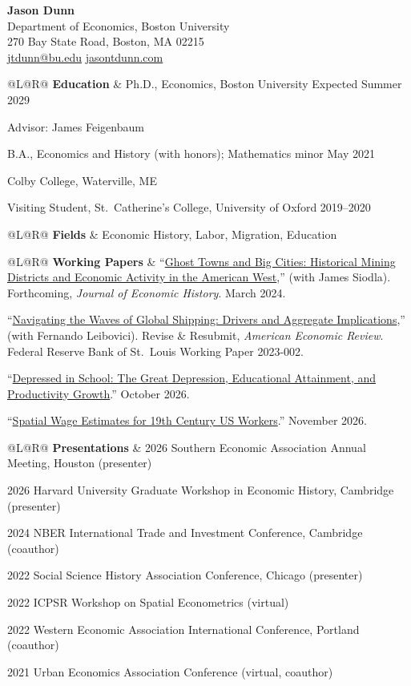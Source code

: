 \documentclass[11pt]{article}
\makeatletter
\newcommand{\cvrow}[2]{%
  \vspace{8pt}%
  \noindent
  \begin{tabular}{@{}L@{\hspace{10pt}}R@{}}
    {\bfseries #1} & #2
  \end{tabular}\par
}
\newcommand{\gap}{\par\vspace{4pt}}
\newcommand{\entry}[1]{\par\vspace{5pt}#1}
\makeatother
\begin{document}
\begin{center}
{\LARGE\bfseries Jason Dunn}\\[4pt]
Department of Economics, Boston University\\
270 Bay State Road, Boston, MA 02215\\[2pt]
\href{mailto:jtdunn@bu.edu}{jtdunn@bu.edu} \quad \href{https://jasontdunn.com}{jasontdunn.com}
\end{center}

\cvrow{Education}{%
Ph.D., Economics, Boston University \hfill Expected Summer 2029\par
Advisor: James Feigenbaum
\gap
B.A., Economics and History (with honors); Mathematics minor \hfill May 2021\par
Colby College, Waterville, ME
\gap
Visiting Student, St.\ Catherine's College, University of Oxford \hfill 2019--2020
}

\cvrow{Fields}{%
Economic History, Labor, Migration, Education
}

\cvrow{Working Papers}{%
``\href{https://jasontdunn.com/assets/mining.pdf}{Ghost Towns and Big Cities: Historical Mining Districts and Economic Activity in the American West},'' (with James Siodla). Forthcoming, \textit{Journal of Economic History}. March 2024.
\entry{``\href{https://jasontdunn.com/assets/shipping.pdf}{Navigating the Waves of Global Shipping: Drivers and Aggregate Implications},'' (with Fernando Leibovici). Revise \& Resubmit, \textit{American Economic Review}. Federal Reserve Bank of St.\ Louis Working Paper 2023-002.}
\entry{``\href{https://jasontdunn.com/assets/depressed.pdf}{Depressed in School: The Great Depression, Educational Attainment, and Productivity Growth}.'' October 2026.}
\entry{``\href{https://jasontdunn.com/assets/spatialwages.pdf}{Spatial Wage Estimates for 19th Century US Workers}.'' November 2026.}
}

\cvrow{Presentations}{%
2026 Southern Economic Association Annual Meeting, Houston (presenter)\par
2026 Harvard University Graduate Workshop in Economic History, Cambridge (presenter)\par
2024 NBER International Trade and Investment Conference, Cambridge (coauthor)\par
2022 Social Science History Association Conference, Chicago (presenter)\par
2022 ICPSR Workshop on Spatial Econometrics (virtual)\par
2022 Western Economic Association International Conference, Portland (coauthor)\par
2021 Urban Economics Association Conference (virtual, coauthor)
}
\end{document}
